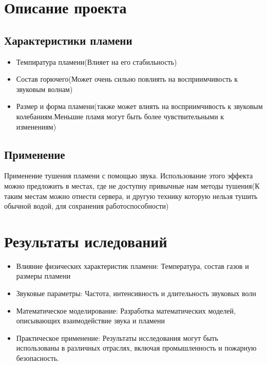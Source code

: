\documentclass[a4paper,12pt]{article}
\begin{document}
\section{Описание проекта}
\subsection{Характеристики пламени}
\begin{itemize}
    \item Темпиратура пламени(Влияет на его стабильность)
    \item Состав горючего(Может очень сильно повлиять на восприимчивость к звуковым волнам)
    \item Размер и форма пламени(также может влиять на восприимчивость к звуковым колебаниям.Меньшие пламя могут быть более чувствительными к изменениям)
\end{itemize}
\subsection{Применение}
Применение тушения пламени с помощью звука. Использование этого эффекта можно предложить в местах, где не доступну привычные нам методы тушения(К таким местам можно отнести сервера, и другую технику которую нельзя тушить обычной водой, для сохранения работоспособности)
\section{Результаты иследований}
\begin{itemize}
    \item Влияние физических характеристик пламени: Температура, состав газов и размеры пламени
    \item Звуковые параметры: Частота, интенсивность и длительность звуковых волн
    \item Математическое моделирование: Разработка математических моделей, описывающих взаимодействие звука и пламени
    \item Практическое применение: Результаты исследования могут быть использованы в различных отраслях, включая промышленность и пожарную безопасность.
\end{itemize}
\end{document}
